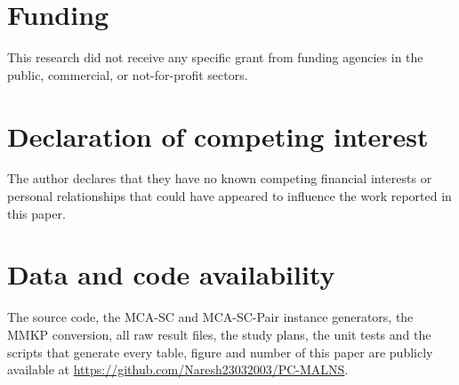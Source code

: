 \documentclass[a4paper,fleqn]{cas-sc}
\begin{document}
\section*{Funding}
This research did not receive any specific grant from funding agencies in the public, commercial, or not-for-profit sectors.

\section*{Declaration of competing interest}
The author declares that they have no known competing financial interests or personal relationships that could have appeared to influence the work reported in this paper.

\section*{Data and code availability}
The source code, the MCA-SC and MCA-SC-Pair instance generators, the MMKP conversion, all raw result files, the study plans, the unit tests and the scripts that generate every table, figure and number of this paper are publicly available at \url{https://github.com/Naresh23032003/PC-MALNS}.

\FloatBarrier
\appendix
\end{document}
